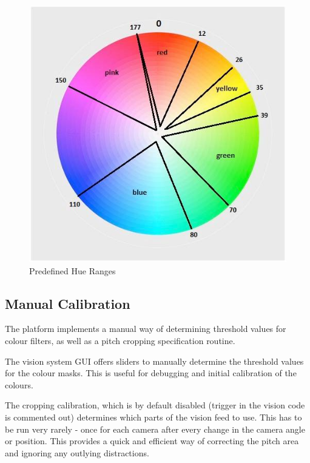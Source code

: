 \begin{figure}[H]
\centering
\includegraphics[scale=0.4]{vision_hue}
\caption{Predefined Hue Ranges}
\label{fig:hues}
\end{figure}

\subsection{Manual Calibration}
The platform implements a manual way of determining threshold values for colour filters, as well as a pitch cropping specification routine.

The vision system GUI offers sliders to manually determine the threshold values for the colour masks. This is useful for debugging and initial calibration of the colours.

The cropping calibration, which is by default disabled (trigger in the vision code is commented out) determines which parts of the vision feed to use. This has to be run very rarely - once for each camera after every change in the camera angle or position. This provides a quick and efficient way of correcting the pitch area and ignoring any outlying distractions.
